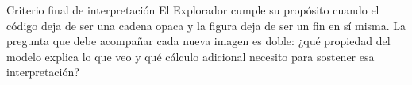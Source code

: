 \documentclass[11pt]{article}
\begin{document}
\begin{idea}{Criterio final de interpretación}
El Explorador cumple su propósito cuando el código deja de ser una cadena opaca y la
figura deja de ser un fin en sí misma. La pregunta que debe acompañar cada nueva imagen
es doble: ¿qué propiedad del modelo explica lo que veo y qué cálculo adicional necesito
para sostener esa interpretación?
\end{idea}
\end{document}
